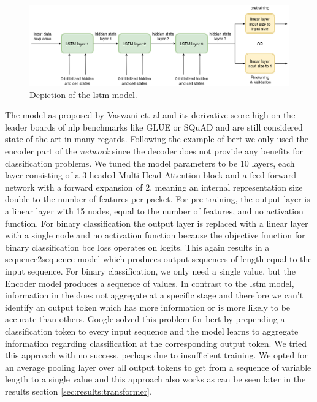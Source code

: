 \begin{figure}[h]
	\centering
	\includegraphics[width=0.95\linewidth]{graphics/img/lstm_model.png}
	\caption{Depiction of the \gls{lstm} model.}
	\label{fig:lstm_model}
\end{figure}

The  model as proposed by Vaswani et. al \cite{attention} and its derivative score high on the leader boards of \gls{nlp} benchmarks like GLUE \cite{glue} or SQuAD \cite{bibid} and are still considered state-of-the-art in many regards. Following the example of \gls{bert} we only used the encoder part of the \textit{ network} since the decoder does not provide any benefits for classification problems. We tuned the model parameters to be 10  layers, each layer consisting of a 3-headed Multi-Head Attention block and a feed-forward network with a forward expansion of 2, meaning an internal representation size double to the number of features per packet. For pre-training, the output layer is a linear layer with 15 nodes, equal to the number of features, and no activation function. For binary classification the output layer is replaced with a linear layer with a single node and no activation function because the objective function for binary classification \gls{bce} loss operates on logits. This again results in a sequence2sequence model which produces output sequences of length equal to the input sequence. For binary classification, we only need a single value, but the  Encoder model produces a sequence of values. In contrast to the \gls{lstm} model, information in the  does not aggregate at a specific stage and therefore we can't identify an output token which has more information or is more likely to be accurate than others. Google solved this problem for \gls{bert} by prepending a classification token to every input sequence and the model learns to aggregate information regarding classification at the corresponding output token. We tried this approach with no success, perhaps due to insufficient training. We opted for an average pooling layer over all output tokens to get from a sequence of variable length to a single value and this approach also works as can be seen later in the results section \ref{sec:results:transformer}.

